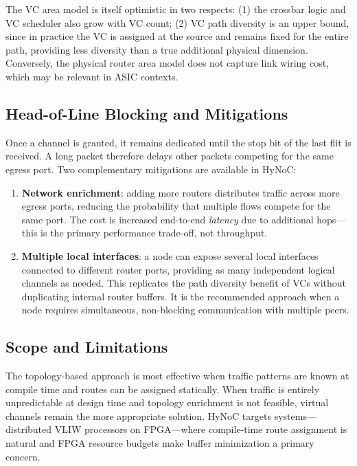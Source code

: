 The VC area model is itself optimistic in two respects: (1) the crossbar logic and
VC scheduler also grow with VC count; (2) VC path diversity is an upper bound,
since in practice the VC is assigned at the source and remains fixed for the entire
path, providing less diversity than a true additional physical dimension.
Conversely, the physical router area model does not capture link wiring cost, which
may be relevant in ASIC contexts.

\subsection{Head-of-Line Blocking and Mitigations}

Once a channel is granted, it remains dedicated until the stop bit of the last
flit is received. A long packet therefore delays other packets competing for the
same egress port. Two complementary mitigations are available in HyNoC:

\begin{enumerate}
  \item \textbf{Network enrichment}: adding more routers distributes traffic
    across more egress ports, reducing the probability that multiple flows compete
    for the same port. The cost is increased end-to-end \emph{latency} due to
    additional hops---this is the primary performance trade-off, not throughput.
  \item \textbf{Multiple local interfaces}: a node can expose several local
    interfaces connected to different router ports, providing as many independent
    logical channels as needed. This replicates the path diversity benefit of VCs
    without duplicating internal router buffers. It is the recommended approach
    when a node requires simultaneous, non-blocking communication with multiple
    peers.
\end{enumerate}

\subsection{Scope and Limitations}

The topology-based approach is most effective when traffic patterns are known at
compile time and routes can be assigned statically. When traffic is entirely
unpredictable at design time and topology enrichment is not feasible, virtual
channels remain the more appropriate solution. HyNoC targets systems---distributed
VLIW processors on FPGA---where compile-time route assignment is natural and FPGA
resource budgets make buffer minimization a primary concern.
